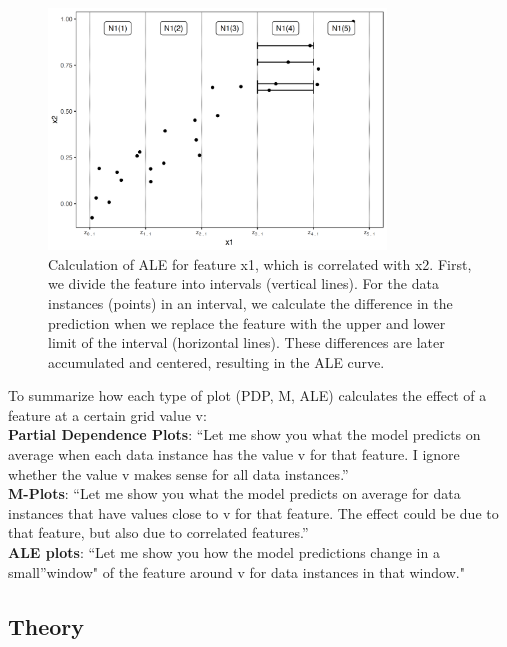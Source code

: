 \documentclass[
  11pt,
]{scrbook}
\begin{document}
\begin{figure}

{\centering \includegraphics[width=0.8\textwidth]{images/aleplot-computation-1} 

}

\caption{Calculation of ALE for feature x1, which is correlated with x2. First, we divide the feature into intervals (vertical lines). For the data instances (points) in an interval, we calculate the difference in the prediction when we replace the feature with the upper and lower limit of the interval (horizontal lines). These differences are later accumulated and centered, resulting in the ALE curve.}\label{fig:aleplot-computation}
\end{figure}

To summarize how each type of plot (PDP, M, ALE) calculates the effect of a feature at a certain grid value v:\\
\textbf{Partial Dependence Plots}: ``Let me show you what the model predicts on average when each data instance has the value v for that feature.
I ignore whether the value v makes sense for all data instances.''\\
\textbf{M-Plots}: ``Let me show you what the model predicts on average for data instances that have values close to v for that feature.
The effect could be due to that feature, but also due to correlated features.''\\
\textbf{ALE plots}: ``Let me show you how the model predictions change in a small''window" of the feature around v for data instances in that window."

\hypertarget{theory-2}{%
\subsection{Theory}\label{theory-2}}
\end{document}
